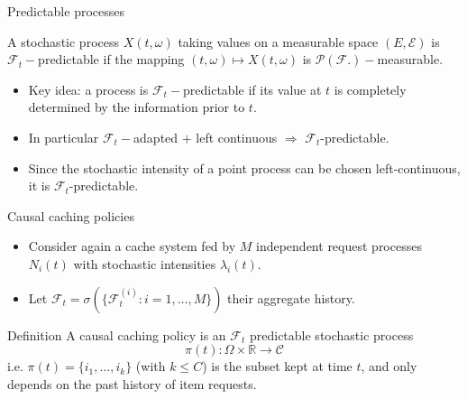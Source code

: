 \documentclass[aspectratio=169]{beamer}
\newenvironment*{myitem}[1][1.5em]{\begin{itemize}\setlength{\itemsep}{#1}}{\end{itemize}}
\begin{document}
\begin{frame}{Predictable processes}

	\begin{definition}
		A stochastic process $X(t,\omega)$ taking values on a measurable space $(E,\mathcal{E})$ is \alert{$\mathcal{F}_t-$predictable} if the mapping $(t,\omega) \mapsto X(t,\omega)$ is $\mathcal{P}(\mathcal{F}.)-$measurable.
	\end{definition}

	\vfill
	\begin{myitem}
		\item \alert{Key idea:} a process is $\mathcal{F}_t-$predictable if its value at $t$ is completely determined by the information prior to $t$.
		\pause
		\item In particular $\mathcal{F}_t-$adapted $+$ left continuous $\Longrightarrow$ $\mathcal{F}_t$-predictable.
		
		\item Since the stochastic intensity of a point process can be chosen left-continuous, it is $\mathcal{F}_t$-predictable.
	\end{myitem}

\end{frame}
\begin{frame}{Causal caching policies}
	
	\begin{myitem}[1em]
		\item Consider again a cache system fed by $M$ \alert{independent} request processes $N_i(t)$ with stochastic intensities $\lambda_i(t)$.
		\item Let $\mathcal{F}_t = \sigma(\{\mathcal{F}_t^{(i)}: i=1,\ldots,M\})$ their aggregate history.
	\end{myitem}

	\vfill

	\begin{block}{Definition}
		A \alert{causal} caching policy is an $\mathcal{F}_t$ \alert{predictable} stochastic process
		\begin{equation*}
			\pi(t):\Omega\times\mathbb{R} \to \mathcal{C}
		\end{equation*}
		i.e. $\pi(t) = \{i_1,\ldots,i_k\}$ (with $k\leqslant C$) is the subset kept at time $t$, and only depends on the past history of item requests.
	\end{block}

\end{frame}
\end{document}
